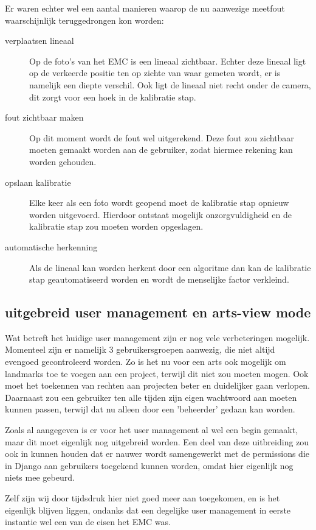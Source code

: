 Er waren echter wel een aantal manieren waarop de nu aanwezige meetfout waarschijnlijk teruggedrongen kon worden:
\begin{description}
	\item[verplaatsen lineaal] Op de foto's van het EMC is een lineaal zichtbaar. 
	Echter deze lineaal ligt op de verkeerde positie ten op zichte van waar gemeten wordt, er is namelijk een diepte verschil. 
	Ook ligt de lineaal niet recht onder de camera, dit zorgt voor een hoek in de kalibratie stap.
	\item[fout zichtbaar maken] Op dit moment wordt de fout wel uitgerekend. 
	Deze fout zou zichtbaar moeten gemaakt worden aan de gebruiker, zodat hiermee rekening kan worden gehouden.
	\item[opslaan kalibratie] Elke keer als een foto wordt geopend moet de kalibratie stap opnieuw worden uitgevoerd. 
	Hierdoor ontstaat mogelijk onzorgvuldigheid en de kalibratie stap zou moeten worden opgeslagen.
	\item[automatische herkenning] Als de lineaal kan worden herkent door een algoritme dan kan de kalibratie stap geautomatiseerd worden en wordt de menselijke factor verkleind.
\end{description}

\subsection{uitgebreid user management en arts-view mode}
Wat betreft het huidige user management zijn er nog vele verbeteringen mogelijk.
Momenteel zijn er namelijk 3 gebruikersgroepen aanwezig, die niet altijd evengoed gecontroleerd worden.
Zo is het nu voor een arts ook mogelijk om landmarks toe te voegen aan een project, terwijl dit niet zou moeten mogen.
Ook moet het toekennen van rechten aan projecten beter en duidelijker gaan verlopen.
Daarnaast zou een gebruiker ten alle tijden zijn eigen wachtwoord aan moeten kunnen passen, terwijl dat nu alleen door een 'beheerder' gedaan kan worden.

Zoals al aangegeven is er voor het user management al wel een begin gemaakt, maar dit moet eigenlijk nog uitgebreid worden.
Een deel van deze uitbreiding zou ook in kunnen houden dat er nauwer wordt samengewerkt met de permissions die in Django aan gebruikers toegekend kunnen worden, omdat hier eigenlijk nog niets mee gebeurd.

Zelf zijn wij door tijdsdruk hier niet goed meer aan toegekomen, en is het eigenlijk blijven liggen, ondanks dat een degelijke user management in eerste instantie wel een van de eisen het EMC was.

